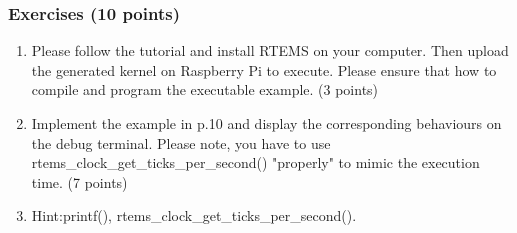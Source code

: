 \documentclass[t]{beamer}
\begin{document}
\begin{frame}
\begin{center}
  \end{center}
  
\end{frame}

\begin{frame}
\frametitle{Exercises (10 points)}
\begin{enumerate}
\item Please follow the tutorial and install RTEMS on your computer. Then upload the generated kernel on Raspberry Pi to execute. Please ensure that how to compile and program the executable example. (3 points)
\item Implement the example in p.10 and display the corresponding behaviours on the debug terminal. Please note, you have to use rtems\_clock\_get\_ticks\_per\_second() "properly" to mimic the execution time. (7 points) 
\item Hint:printf(), rtems\_clock\_get\_ticks\_per\_second().
\end{enumerate}
\end{frame}
\end{document}
